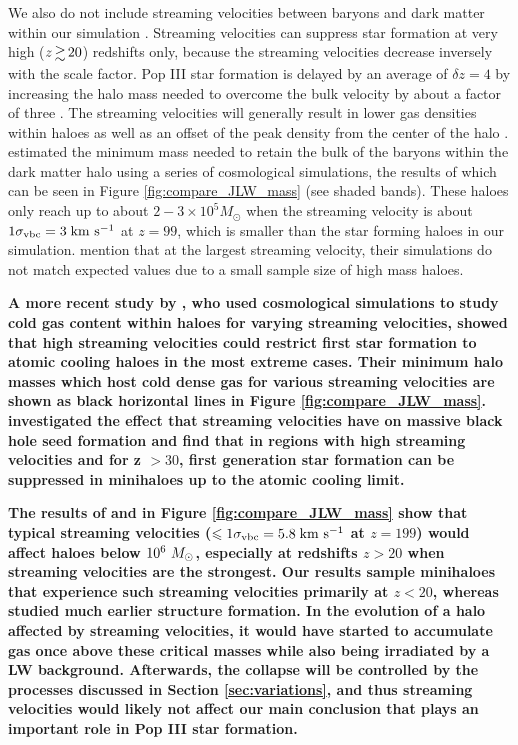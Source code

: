 \documentclass[fleqn,usenatbib]{mnras}
\begin{document}
We also do not include streaming velocities between baryons and dark matter within our simulation \citep{Tselia11, Greif11_Delay, Naoz12, OLeary12, Schauer19, Hirano17_Science}. Streaming velocities can suppress star formation at very high ($z \ga 20$) redshifts only, because the streaming velocities decrease inversely with the scale factor. Pop III star formation is delayed by an average of $\delta z = 4$ by increasing the halo mass needed to overcome the bulk velocity by about a factor of three \citep{Greif11_Delay}. The streaming velocities will generally result in lower gas densities within haloes as well as an offset of the peak density from the center of the halo \citep{OLeary12}. \citet{Naoz13} estimated the minimum mass needed to retain the bulk of the baryons within the dark matter halo using a series of cosmological simulations, the results of which can be seen in Figure \ref{fig:compare_JLW_mass} (see shaded bands). These haloes only reach up to about $2 - 3 \times 10^5 M_\odot$ when the streaming velocity is about $1\sigma_{\rm vbc} = 3 \kms$ at $z=99$, which is smaller than the star forming haloes in our simulation. \citet{Naoz13} mention that at the largest streaming velocity, their simulations do not match expected values due to a small sample size of high mass haloes. 

\textbf{A more recent study by \citet{Schauer19}, who used cosmological simulations to study cold gas content within haloes for varying streaming velocities, showed that high streaming velocities could restrict first star formation to atomic cooling haloes in the most extreme cases. Their minimum halo masses which host cold dense gas for various streaming velocities are shown as black horizontal lines in Figure \ref{fig:compare_JLW_mass}. \citet{Hirano17_Science} investigated the effect that streaming velocities have on massive black hole seed formation and find that in regions with high streaming velocities and for z $> 30$, first generation star formation can be suppressed in minihaloes up to the atomic cooling limit.} 

\textbf{The results of \citet{Naoz13} and \citep{Schauer19} in Figure \ref{fig:compare_JLW_mass} show that typical streaming velocities ($\le 1\sigma_{\rm vbc} = 5.8\kms$ at $z=199$) would affect haloes below $10^6~\Ms$, especially at redshifts $z>20$ when streaming velocities are the strongest.  Our results sample minihaloes that experience such streaming velocities primarily at $z < 20$, whereas \citet{Hirano17_Science} studied much earlier structure formation. In the evolution of a halo affected by streaming velocities, it would have started to accumulate gas once above these critical masses while also being irradiated by a LW background.  Afterwards, the collapse will be controlled by the processes discussed in Section \ref{sec:variations}, and thus streaming velocities would likely not affect our main conclusion that \hh{} plays an important role in Pop III star formation.}
\end{document}
